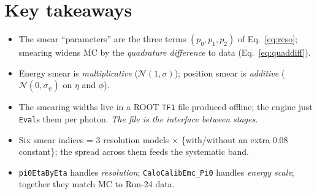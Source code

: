 \documentclass[11pt]{article}
\begin{document}
\section*{Key takeaways}
\begin{itemize}[nosep]
  \item The smear ``parameters'' are the three terms $(p_0,p_1,p_2)$ of
        Eq.~\eqref{eq:reso}; smearing widens MC by the \emph{quadrature difference}
        to data (Eq.~\eqref{eq:quaddiff}).
  \item Energy smear is \emph{multiplicative} ($\mathcal{N}(1,\sigma)$); position
        smear is \emph{additive} ($\mathcal{N}(0,\sigma_\psi)$ on $\eta$ and $\phi$).
  \item The smearing widths live in a ROOT \texttt{TF1} file produced offline; the
        engine just \texttt{Eval}s them per photon. \emph{The file is the interface
        between stages.}
  \item Six smear indices = 3 resolution models $\times$ \{with/without an extra
        0.08 constant\}; the spread across them feeds the systematic band.
  \item \texttt{pi0EtaByEta} handles \emph{resolution}; \texttt{CaloCalibEmc\_Pi0}
        handles \emph{energy scale}; together they match MC to Run-24 data.
\end{itemize}
\end{document}
